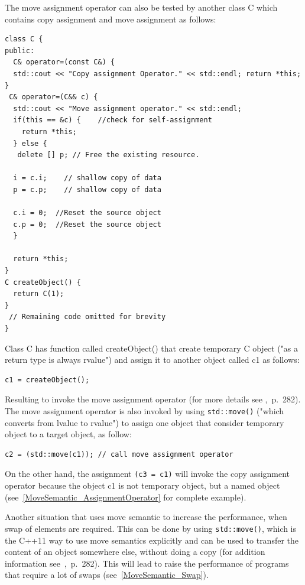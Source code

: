 \documentclass[11pt]{report}
\begin{document}
The move assignment operator can also be tested by another class C which contains copy assignment and move assignment as follows:
\begin{lstlisting}
class C {
public:
  C& operator=(const C&) { 
  std::cout << "Copy assignment Operator." << std::endl; return *this; 
}
 C& operator=(C&& c) {
  std::cout << "Move assignment operator." << std::endl;
  if(this == &c) {    //check for self-assignment
    return *this;
  } else {
   delete [] p; // Free the existing resource.

  i = c.i;    // shallow copy of data
  p = c.p;    // shallow copy of data

  c.i = 0;  //Reset the source object
  c.p = 0;  //Reset the source object
  }
  
  return *this; 
}
C createObject() {
  return C(1);
}
 // Remaining code omitted for brevity
}
\end{lstlisting}

Class C has function called createObject() that create temporary C object ("as a return type is always rvalue") and assign it to another object called c1 as follows:
\begin{lstlisting}
c1 = createObject();
\end{lstlisting}

Resulting to invoke the move assignment operator (for more details see \cite{Gregorie:professionalcpp},~p.~282). The move assignment operator is also invoked by using \texttt{std::move()} ("which converts from lvalue to rvalue") to assign one object that consider temporary object to a target object, as follow:
\begin{lstlisting}
c2 = (std::move(c1)); // call move assignment operator
\end{lstlisting}

On the other hand, the assignment \texttt{(c3 = c1)} will invoke the copy assignment operator because the object c1 is not temporary object, but a named object (see~\ref{MoveSemantic_AssignmentOperator} for complete example).

Another situation that uses move semantic to increase the performance, when swap of elements are required. This can be done by using \texttt{std::move()}, which is the C++11 way to use move semantics explicitly and can be used to transfer the content of an object somewhere else, without doing a copy (for addition information see~\cite{Gregorie:professionalcpp},~p.~282). This will lead to raise the performance of programs that require a lot of swaps (see~\ref{MoveSemantic_Swap}).
\end{document}
